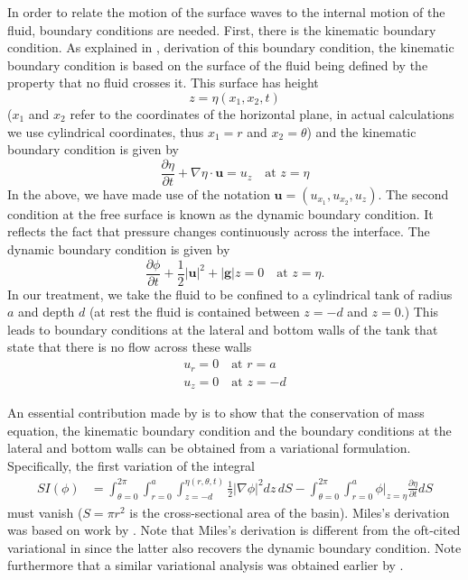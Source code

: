In order to relate the motion of the surface waves to the internal motion of the fluid, boundary conditions are needed. First, there is the kinematic boundary condition. As explained in \citet{whitham74:_linear}, derivation of this boundary condition, the kinematic boundary condition is based on the surface of the fluid being defined by the property that no fluid crosses it. This surface has height
\begin{equation}
z = \eta (x_1, x_2, t)
\end{equation}
($x_1$ and $x_2$ refer to the coordinates of the horizontal plane, in actual calculations we use cylindrical coordinates, thus $x_1 = r$ and $x_2 = \theta$) and the kinematic boundary condition is given by
\begin{equation}
\frac{\partial \eta}{\partial t} + \nabla \eta \cdot \boldsymbol{u} = u_z \quad \text{at } z = \eta
\end{equation}
In the above, we have made use of the notation $\boldsymbol{u} = (u_{x_1}, u_{x_2}, u_z )$. The second condition at the free surface is known as the dynamic boundary condition. It reflects the fact that pressure changes continuously across the interface. The dynamic boundary condition is given by
\begin{equation}
\frac{\partial \phi}{\partial t} + \frac12 |\boldsymbol{u}|^2 + |\boldsymbol{g}|z = 0 \quad \text{at } z = \eta .
\end{equation}
In our treatment, we take the fluid to be confined to a cylindrical tank of radius $a$ and depth $d$ (at rest the fluid is contained between $z = -d$ and $z = 0$.) This leads to boundary conditions at the lateral and bottom walls of the tank that state that there is no flow across these walls
\begin{gather*}
u_r = 0 \quad \text{at } r = a\\
u_z = 0 \quad \text{at } z = - d
\end{gather*}

An essential contribution made by \citet{miles76:_nonlin} is to show that the conservation of mass equation, the kinematic boundary condition and the boundary conditions at the lateral and bottom walls can be obtained from a variational formulation. Specifically, the first variation of the integral
\begin{equation}
\begin{split}
SI (\phi)& = \int_{\theta = 0}^{2 \pi} \int_{r = 0}^a \int_{z = - d}^{\eta ( r, \theta, t )} \frac12 | \nabla \phi |^2 dz \, dS - \int_{\theta = 0}^{2 \pi} \int_{r = 0}^a  \phi |_{z = \eta} \frac{\partial \eta}{\partial t} dS
\end{split}
\end{equation}
must vanish ($S = \pi r^2$ is the cross-sectional area of the basin). Miles's derivation was based on work by \citet{serrin59:_encyc_physic}. Note that Miles's derivation is different from the oft-cited variational in \citet{luke67:_variat_princ_for_fluid_with_free_surfac} since the latter also recovers the dynamic boundary condition. Note furthermore that a similar variational analysis was obtained earlier by \citet{zakharov68:_stabil_of_period_waves}.

